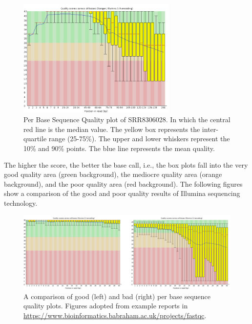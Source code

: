 \documentclass[
  letterpaper,
  DIV=11,
  numbers=noendperiod]{scrreprt}
\begin{document}
\begin{figure}

{\centering \includegraphics[width=0.7\textwidth,height=\textheight]{./assets/21_fqc_per_base_seq_qual.png}

}

\caption{Per Base Sequence Quality plot of SRR8306028. In which the
central red line is the median value. The yellow box represents the
inter-quartile range (25-75\%). The upper and lower whiskers represent
the 10\% and 90\% points. The blue line represents the mean quality.}

\end{figure}

The higher the score, the better the base call, i.e., the box plots fall
into the very good quality area (green background), the mediocre quality
area (orange background), and the poor quality area (red background).
The following figures show a comparison of the good and poor quality
results of Illumina sequencing technology.

\begin{figure}

{\centering \includegraphics{./assets/31_fqc_compare_quality.png}

}

\caption{A comparison of good (left) and bad (right) per base sequence
quality plots. Figures adopted from example reports in
\url{https://www.bioinformatics.babraham.ac.uk/projects/fastqc}.}

\end{figure}
\end{document}
